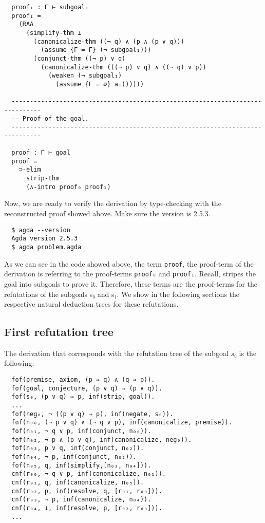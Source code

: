 \documentclass[../main.tex]{subfiles}
\begin{document}
\begin{subappendices}
\begin{verbatim}
  proof₁ : Γ ⊢ subgoal₁
  proof₁ =
    (RAA
      (simplify-thm ⊥
        (canonicalize-thm ((¬ q) ∧ (p ∧ (p ∨ q)))
          (assume {Γ = Γ} (¬ subgoal₁)))
        (conjunct-thm ((¬ p) ∨ q)
          (canonicalize-thm (((¬ p) ∨ q) ∧ ((¬ q) ∨ p))
            (weaken (¬ subgoal₁)
              (assume {Γ = ∅} a₁))))))

  ------------------------------------------------------------------------------
  -- Proof of the goal.
  ------------------------------------------------------------------------------

  proof : Γ ⊢ goal
  proof =
    ⊃-elim
      strip-thm
      (∧-intro proof₀ proof₁)
  \end{verbatim}

Now, we are ready to verify the \Metis derivation by type-checking with
\Agda the reconstructed proof showed above. Make sure the \Agda version is
 2.5.3.

\begin{verbatim}
  $ agda --version
  Agda version 2.5.3
  $ agda problem.agda
\end{verbatim}

As we can see in the \Agda code showed above, the term \verb!proof!,
the proof-term of the \Metis derivation is referring to the
proof-terms \verb!proof₀! and \verb!proof₁!. Recall, \Metis stripes
the goal into subgoals to prove it. Therefore, these terms are the
proof-terms for the refutations of the subgoals s₀ and s₁. We show
in the following sections the respective natural deduction trees for
these refutations.

\subsection{First refutation tree}

The \TSTP derivation that corresponds with the refutation
tree of the subgoal $s₀$ is the following:

\begin{verbatim}
  fof(premise, axiom, (p ⇒ q) ∧ (q ⇒ p)).
  fof(goal, conjecture, (p ∨ q) ⇒ (p ∧ q)).
  fof(s₀, (p ∨ q) ⇒ p, inf(strip, goal)).
  ...
  fof(neg₀, ¬ ((p ∨ q) ⇒ p), inf(negate, s₀)).
  fof(n₀₀, (¬ p ∨ q) ∧ (¬ q ∨ p), inf(canonicalize, premise)).
  fof(n₀₁, ¬ q ∨ p, inf(conjunct, n₀₀)).
  fof(n₀₂, ¬ p ∧ (p ∨ q), inf(canonicalize, neg₀)).
  fof(n₀₃, p ∨ q, inf(conjunct, n₀₂)).
  fof(n₀₄, ¬ p, inf(conjunct, n₀₂)).
  fof(n₀₅, q, inf(simplify,[n₀₃, n₀₄])).
  cnf(r₀₀, ¬ q ∨ p, inf(canonicalize, n₀₁)).
  cnf(r₀₁, q, inf(canonicalize, n₀₅)).
  cnf(r₀₂, p, inf(resolve, q, [r₀₁, r₀₀])).
  cnf(r₀₃, ¬ p, inf(canonicalize, n₀₄)).
  cnf(r₀₄, ⊥, inf(resolve, p, [r₀₂, r₀₃])).
  ...
\end{verbatim}


\end{subappendices}
\end{document}
